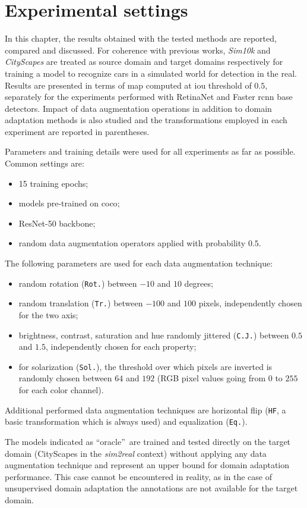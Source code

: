 \documentclass[%
    corpo=12pt,
    twoside,
    stile=classica,   
    tipotesi=magistrale,
    evenboxes,
    english,
	numerazioneromana,
]{toptesi}
\begin{document}
\section{Experimental settings}
In this chapter, the results obtained with the tested methods are reported, compared and discussed. For coherence with previous works, \textit{Sim10k} and \textit{CityScapes} are treated as source domain and target domains respectively for training a model to recognize cars in a simulated world for detection in the real. Results are presented in terms of \gls{map} computed at \gls{iou} threshold of $ 0.5 $, separately for the experiments performed with RetinaNet and Faster \gls{rcnn} base detectors. Impact of data augmentation operations in addition to domain adaptation methods is also studied and the transformations employed in each experiment are reported in parentheses.

Parameters and training details were used for all experiments as far as possible. Common settings are:
\begin{itemize}
	\item 15 training epochs;
	\item models pre-trained on \gls{coco};
	\item ResNet-50 backbone;
	\item random data augmentation operators applied with probability $ 0.5 $.
\end{itemize}
The following parameters are used for each data augmentation technique:
\begin{itemize}
	\item random rotation (\texttt{Rot.}) between $ -10 $ and $ 10 $ degrees;
	\item random translation (\texttt{Tr.}) between $ -100 $ and $ 100 $ pixels, independently chosen for the two axis;
	\item brightness, contrast, saturation and hue randomly jittered (\texttt{C.J.}) between $ 0.5 $ and $ 1.5 $, independently chosen for each property;
	\item for solarization (\texttt{Sol.}), the threshold over which pixels are inverted is randomly chosen between $ 64 $ and $ 192 $ (RGB pixel values going from $ 0 $ to $ 255 $ for each color channel).
\end{itemize}

Additional performed data augmentation techniques are horizontal flip (\texttt{HF}, a basic transformation which is always used) and equalization (\texttt{Eq.}).

\bigskip
The models indicated as \textquotedblleft oracle\textquotedblright~are trained and tested directly on the target domain (CityScapes in the \textit{sim2real} context) without applying any data augmentation technique and represent an upper bound for domain adaptation performance. This case cannot be encountered in reality, as in the case of unsupervised domain adaptation the annotations are not available for the target domain.
\end{document}
